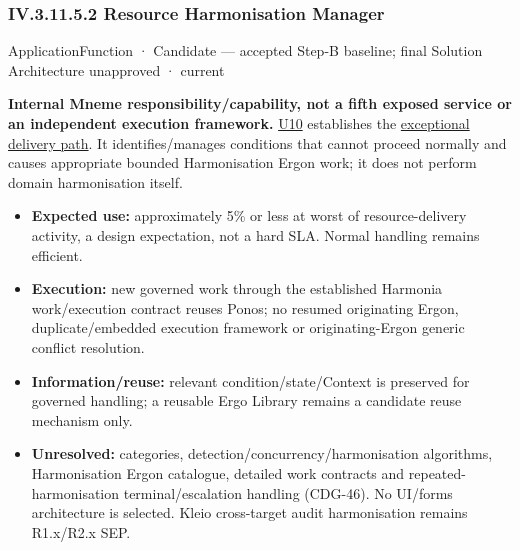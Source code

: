 \subsubsection*{IV.3.11.5.2 Resource Harmonisation Manager}
\label{navigation:IV.3.11.5.2}

\label{element:a6580e0b9f0f40c9a33d731d20110057}
{\small ApplicationFunction · Candidate — accepted Step-B baseline; final Solution Architecture unapproved · current}\par

\textbf{Internal Mneme responsibility/capability, not a fifth exposed service or an
independent execution framework.} \href{\detokenize{../../../../../docs/markdown/05-information-systems-architecture/sources.md#u10}}{U10} establishes the
\hyperref[element:a6580e0b9f0f40c9a33d731d20110057]{exceptional delivery path}.
It identifies/manages conditions that cannot proceed normally and causes appropriate
bounded Harmonisation Ergon work; it does not perform domain harmonisation itself.



\begin{itemize}


\item \textbf{Expected use:} approximately 5\% or less at worst of resource-delivery activity,
  a design expectation, not a hard SLA. Normal handling remains efficient.

\item \textbf{Execution:} new governed work through the established Harmonia work/execution
  contract reuses Ponos; no resumed originating Ergon, duplicate/embedded execution
  framework or originating-Ergon generic conflict resolution.

\item \textbf{Information/reuse:} relevant condition/state/Context is preserved for governed
  handling; a reusable Ergo Library remains a candidate reuse mechanism only.

\item \textbf{Unresolved:} categories, detection/concurrency/harmonisation algorithms,
  Harmonisation Ergon catalogue, detailed work contracts and repeated-harmonisation
  terminal/escalation handling (CDG-46). No UI/forms architecture is selected.
  Kleio cross-target audit harmonisation remains R1.x/R2.x SEP.

\end{itemize}

